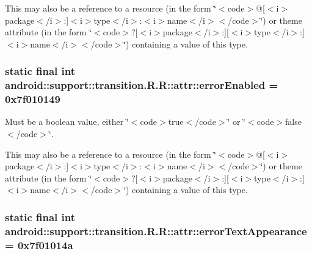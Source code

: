 This may also be a reference to a resource (in the form \char`\"{}$<$code$>$@\mbox{[}$<$i$>$package$<$/i$>$:\mbox{]}$<$i$>$type$<$/i$>$:$<$i$>$name$<$/i$>$$<$/code$>$\char`\"{}) or theme attribute (in the form \char`\"{}$<$code$>$?\mbox{[}$<$i$>$package$<$/i$>$:\mbox{]}\mbox{[}$<$i$>$type$<$/i$>$:\mbox{]}$<$i$>$name$<$/i$>$$<$/code$>$\char`\"{}) containing a value of this type. \hypertarget{classandroid_1_1support_1_1transition_1_1_r_1_1attr_4e7eead35fe2fe2ddd9cd7aa45dd7fa4}{
\subsubsection[{errorEnabled}]{\setlength{\rightskip}{0pt plus 5cm}static final int android::support::transition.R.R::attr::errorEnabled = 0x7f010149}}
\label{classandroid_1_1support_1_1transition_1_1_r_1_1attr_4e7eead35fe2fe2ddd9cd7aa45dd7fa4}


Must be a boolean value, either \char`\"{}$<$code$>$true$<$/code$>$\char`\"{} or \char`\"{}$<$code$>$false$<$/code$>$\char`\"{}. 

This may also be a reference to a resource (in the form \char`\"{}$<$code$>$@\mbox{[}$<$i$>$package$<$/i$>$:\mbox{]}$<$i$>$type$<$/i$>$:$<$i$>$name$<$/i$>$$<$/code$>$\char`\"{}) or theme attribute (in the form \char`\"{}$<$code$>$?\mbox{[}$<$i$>$package$<$/i$>$:\mbox{]}\mbox{[}$<$i$>$type$<$/i$>$:\mbox{]}$<$i$>$name$<$/i$>$$<$/code$>$\char`\"{}) containing a value of this type. \hypertarget{classandroid_1_1support_1_1transition_1_1_r_1_1attr_0f4e93fb871cec5457e18791cf90699c}{
\subsubsection[{errorTextAppearance}]{\setlength{\rightskip}{0pt plus 5cm}static final int android::support::transition.R.R::attr::errorTextAppearance = 0x7f01014a}}
\label{classandroid_1_1support_1_1transition_1_1_r_1_1attr_0f4e93fb871cec5457e18791cf90699c}


